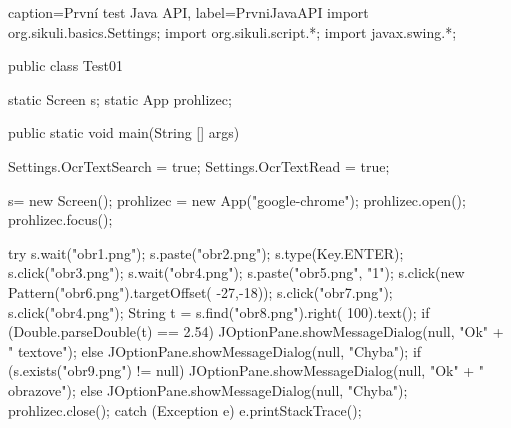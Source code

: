 \begin{lstjava}{caption={První test Java API}, label={PrvniJavaAPI}}
import org.sikuli.basics.Settings;
import org.sikuli.script.*;
import javax.swing.*;

public class Test01 {

  static Screen s;
  static App prohlizec;
  
  public static void main(String [] args) {
    Settings.OcrTextSearch = true;
    Settings.OcrTextRead = true;

    s= new Screen();
    prohlizec = new App("google-chrome");
    prohlizec.open();
    prohlizec.focus();
    
    try {
      s.wait("obr1.png");
      s.paste("obr2.png");
      s.type(Key.ENTER);
      s.click("obr3.png");
      s.wait("obr4.png");
      s.paste("obr5.png", "1");
      s.click(new Pattern("obr6.png").targetOffset(
        -27,-18));
      s.click("obr7.png");
      s.click("obr4.png");
      String t = s.find("obr8.png").right(
        100).text();
      if (Double.parseDouble(t) == 2.54) {
        JOptionPane.showMessageDialog(null, "Ok" +
          " textove");
      } else {
        JOptionPane.showMessageDialog(null, "Chyba");
      }
      if (s.exists("obr9.png") != null) {
        JOptionPane.showMessageDialog(null, "Ok" +
          " obrazove");
      } else {
        JOptionPane.showMessageDialog(null, "Chyba");
      }
      prohlizec.close();
    } catch (Exception e) {
      e.printStackTrace();
    }
  }
}
\end{lstjava}